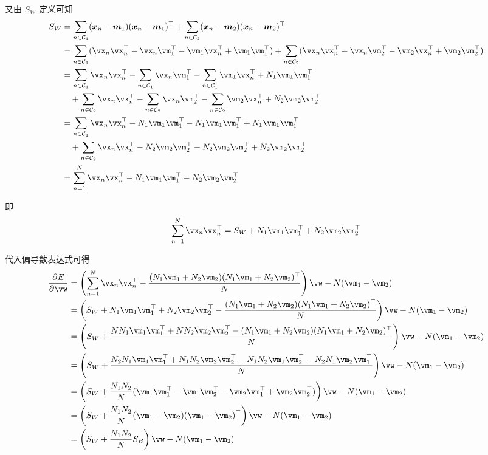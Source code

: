 \documentclass[openany]{ctexbook}
\theoremstyle{kaiti}
\theoremstyle{normal}
\begin{document}
又由 $S_W$ 定义可知
\begin{equation}
  \begin{aligned}
    S_{W}
    &=\sum_{n\in \mathcal{C}_{1}}(\bm{x}_{n}-\bm{m}_{1})(\bm{x}_{n}-\bm{m}_{1})^{\top}+\sum_{n\in \mathcal{C}_{2}}(\bm{x}_{n}-\bm{m}_{2})(\bm{x}_{n}-\bm{m}_{2})^{\top}\\
    &=\sum_{n\in \mathcal{C}_{1}}(\vx_n\vx_n^{\top}-\vx_n\vm_1^{\top}-\vm_1\vx_n^{\top}+\vm_1\vm_1^{\top})+\sum_{n\in \mathcal{C}_{2}}(\vx_n\vx_n^{\top}-\vx_n\vm_2^{\top}-\vm_2\vx_n^{\top}+\vm_2\vm_2^{\top})\\
    &=\sum_{n\in \mathcal{C}_{1}}\vx_n\vx_n^{\top}-\sum_{n\in \mathcal{C}_{1}}\vx_n\vm_1^{\top}-\sum_{n\in \mathcal{C}_{1}}\vm_1\vx_n^{\top}+N_1\vm_1\vm_1^{\top}\\
    &\quad+\sum_{n\in \mathcal{C}_{2}}\vx_n\vx_n^{\top}-\sum_{n\in \mathcal{C}_{2}}\vx_n\vm_2^{\top}-\sum_{n\in \mathcal{C}_{2}}\vm_2\vx_n^{\top}+N_2\vm_2\vm_2^{\top}\\
    &=\sum_{n\in \mathcal{C}_{1}}\vx_n\vx_n^{\top}-N_1\vm_1\vm_1^{\top}-N_1\vm_1\vm_1^{\top}+N_1\vm_1\vm_1^{\top}\\
    &\quad+\sum_{n\in \mathcal{C}_{2}}\vx_n\vx_n^{\top}-N_2\vm_2\vm_2^{\top}-N_2\vm_2\vm_2^{\top}+N_2\vm_2\vm_2^{\top}\\
    &=\sum_{n=1}^N\vx_n\vx_n^{\top}-N_1\vm_1\vm_1^{\top}-N_2\vm_2\vm_2^{\top}\\
  \end{aligned}
\end{equation}

即
\begin{equation}
  \sum_{n=1}^N\vx_n\vx_n^{\top}=S_W+N_1\vm_1\vm_1^{\top}+N_2\vm_2\vm_2^{\top}
\end{equation}

代入偏导数表达式可得
\begin{equation}
  \begin{aligned}
    \frac{\partial E}{\partial \vw}
    &=\left(\sum_{n=1}^{N}\vx_n\vx_n^{\top}-\frac{(N_1\vm_1+N_2\vm_2) (N_1\vm_1+N_2\vm_2)^{\top}}{N}\right)\vw-N(\vm_1-\vm_2)\\
    &=\left(S_W+N_1\vm_1\vm_1^{\top}+N_2\vm_2\vm_2^{\top}-\frac{(N_1\vm_1+N_2\vm_2) (N_1\vm_1+N_2\vm_2)^{\top}}{N}\right)\vw-N(\vm_1-\vm_2)\\
    &=\left(S_W+\frac{NN_1\vm_1\vm_1^{\top}+NN_2\vm_2\vm_2^{\top}-(N_1\vm_1+N_2\vm_2) (N_1\vm_1+N_2\vm_2)^{\top}}{N}\right)\vw-N(\vm_1-\vm_2)\\
    &=\left(S_W+\frac{N_2N_1\vm_1\vm_1^{\top}+N_1N_2\vm_2\vm_2^{\top}-N_1N_2\vm_1\vm_2^{\top}-N_2N_1\vm_2\vm_1^{\top}}{N}\right)\vw-N(\vm_1-\vm_2)\\
    &=\left(S_W+\frac{N_1N_2}{N}(\vm_1\vm_1^{\top}-\vm_1\vm_2^{\top}-\vm_2\vm_1^{\top}+\vm_2\vm_2^{\top})\right)\vw-N(\vm_1-\vm_2)\\
    &=\left(S_W+\frac{N_1N_2}{N}(\vm_1-\vm_2)(\vm_1-\vm_2)^{\top}\right)\vw-N(\vm_1-\vm_2)\\
    &=\left(S_W+\frac{N_1N_2}{N}S_B\right)\vw-N(\vm_1-\vm_2)\\
  \end{aligned}
\end{equation}
\end{document}
